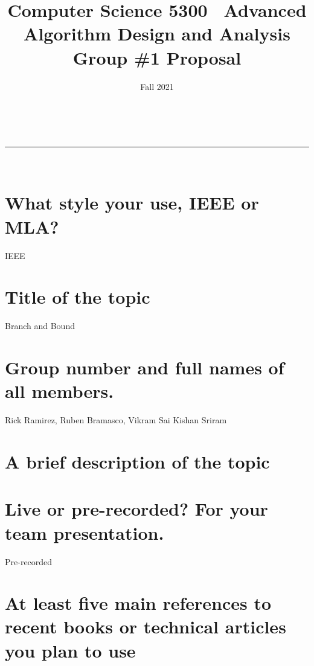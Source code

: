 \documentclass[11pt]{article}
\title{Computer Science 5300
\partition\
    Advanced Algorithm Design and Analysis\\
    \vspace{1ex}
    Group \#1 Proposal}
\author{\small }
\date{Fall 2021}
\makeatletter
\newcommand{\partition}{\rule{\linewidth}{0.8pt}}
\renewcommand{\maketitle}{
    \begin{center}
        \@date \hfill  \@author\\
        {\Large \textsc{\@title}}
        \partition\\
    \end{center}
}
\makeatother
\begin{document}
    \maketitle
    \section{\normalsize What style your use, IEEE or MLA?}
        IEEE
    \section{\normalsize Title of the topic}
        Branch and Bound
    \section{\normalsize Group number and full names of all members.}
        Rick Ramirez, Ruben Bramasco, Vikram Sai Kishan Sriram
    \section{\normalsize A brief description of the topic}
    \section{\normalsize Live or pre-recorded? For your team presentation.}
        Pre-recorded
    \section{\normalsize At least five main references to recent books or technical articles you plan to use}

    \nocite{montanaro2020quantum, baccari2020verifying}
    
    
\end{document}
